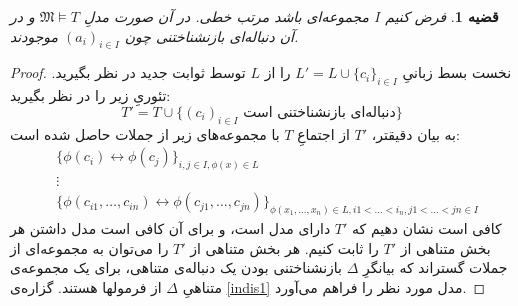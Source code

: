 \documentclass[12pt,a4paper]{report}
\theoremstyle{colorhead}
\newtheorem{thm}{قضیه}
\begin{document}
\begin{thm}
\label{indis2}
فرض کنیم
$I$
مجموعه‌ای باشد مرتب خطی. در آن صورت مدلِ
$\mathfrak{M}\models T$
و در آن دنباله‌ای بازنشناختنی چون
$(a_i)_{i\in I}$
موجودند. 
\end{thm}
\begin{proof}
نخست بسط زبانیِ
$L'=L\cup \{c_i\}_{i\in I}$
را از
$L$
توسط ثوابت جدید در نظر بگیرید. تئوریِ
زیر را در نظر بگیرید:
\[
T'=T\cup \{\text{$(c_i)_{i\in I}$ دنباله‌ای بازنشناختنی است}\}
\]
به بیان دقیقتر،
$T'$
از اجتماعِ
$T$
با مجموعه‌های زیر از جملات حاصل شده است:
\begin{align*}
& \{\phi(c_i)\leftrightarrow \phi(c_j) \}_{i,j\in I, \phi(x)\in L}
\\
& \vdots
\\
& \{\phi(c_{i1},\ldots, c_{in})\leftrightarrow \phi(c_{j1},\ldots,c_{jn})\}_{\phi(x_1,\ldots,x_n)\in L, i1<\ldots<i_n, j1<\ldots<jn\in I}
\end{align*}
کافی است نشان دهیم که
$T'$
دارای مدل است، و برای آن کافی است مدل داشتن هر بخش متناهی از
$T'$
را ثابت کنیم. هر بخش متناهی از 
$T'$
را می‌توان به مجموعه‌ای از جملات گستراند که بیانگرِ 
$\Delta$
بازنشناختنی بودن یک دنباله‌ی متناهی، برای یک مجموعه‌ی متناهیِ
$\Delta$
از فرمولها هستند. گزاره‌ی
\ref{indis1}
مدل مورد نظر را فراهم می‌آورد.
\end{proof}
\newpage 
\end{document}
